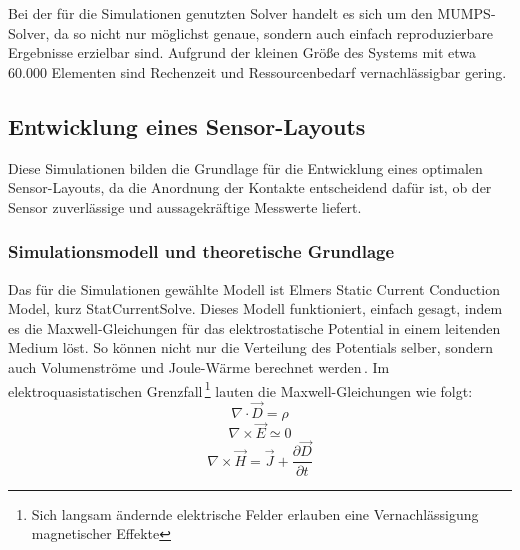 \documentclass[12pt, a4paper]{article}
\begin{document}

Bei der für die Simulationen genutzten Solver handelt es sich um den MUMPS-Solver, da so nicht nur möglichst genaue, sondern auch einfach reproduzierbare Ergebnisse erzielbar sind. Aufgrund der kleinen Größe des Systems mit etwa 60.000 Elementen sind Rechenzeit und Ressourcenbedarf vernachlässigbar gering. 




\subsection{Entwicklung eines Sensor-Layouts}
Diese Simulationen bilden die Grundlage für die Entwicklung eines optimalen Sensor-Layouts, da die Anordnung der Kontakte entscheidend dafür ist, ob der Sensor zuverlässige und aussagekräftige Messwerte liefert.
\subsubsection{Simulationsmodell und theoretische Grundlage}
Das für die Simulationen gewählte Modell ist Elmers Static Current Conduction Model, kurz StatCurrentSolve. Dieses Modell funktioniert, einfach gesagt, indem es die Maxwell-Gleichungen für das elektrostatische Potential in einem leitenden Medium löst. So können nicht nur die Verteilung des Potentials selber, sondern auch Volumenströme und Joule-Wärme berechnet werden\,\cite{elmerModel}.\newline
Im elektroquasistatischen Grenzfall\,\footnote{Sich langsam ändernde elektrische Felder erlauben eine Vernachlässigung magnetischer Effekte} lauten die Maxwell-Gleichungen wie folgt:
\begin{equation}
	\nabla\cdot\vec{D}=\rho
	\tag{4.1}
	\label{4.1}
\end{equation}
\begin{equation}
	\nabla\times\vec{E}\simeq0
	\tag{4.2}
	\label{4.2}
\end{equation}
\begin{equation}
	\nabla\times\vec{H}=\vec{J}+\frac{\partial\vec{D}}{\partial{t}}
	\tag{4.3}
	\label{4.3}
\end{equation}
\end{document}
